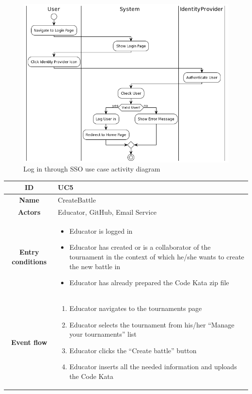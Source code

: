 \begin{center}
\begin{figure}[H]
        \includegraphics[scale=0.5]{Diagrams/activity_loginsso.png}
        \caption{Log in through SSO use case activity diagram}
    \end{figure}
    \begin{tabular}{ |c|m{10cm}| }
        \hline
        \textbf{ID} & UC5 \\
        \hline
        \textbf{Name} & CreateBattle \\
        \hline
        \textbf{Actors} & Educator, GitHub, Email Service \\
        \hline
        \textbf{Entry conditions} &
        \begin{itemize}
            \item Educator is logged in
            \item Educator has created or is a collaborator of the tournament in the context of which he/she wants to create the new battle in
            \item Educator has already prepared the Code Kata zip file
        \end{itemize} \\
        \hline
        \textbf{Event flow} &
        \begin{enumerate}
            \item Educator navigates to the tournaments page
            \item Educator selects the tournament from his/her “Manage your tournaments” list
            \item Educator clicks the “Create battle” button
            \item Educator inserts all the needed information and uploads the Code Kata

\end{enumerate}
\end{tabular}
\end{center}
